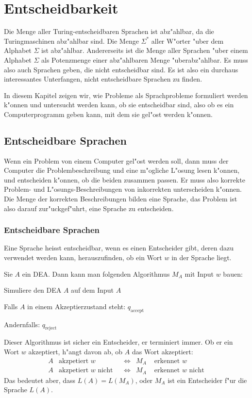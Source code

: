 % 
%
\chapter{Entscheidbarkeit\label{chapter-entscheidbarkeit}}
\rhead{}
Die Menge aller Turing-entscheidbaren Sprachen ist abz"ahlbar,
da die Turingmaschinen abz"ahlbar sind.
Die Menge $\Sigma^*$ aller W"orter "uber dem Alphabet $\Sigma$ ist abz"ahlbar.
Andererseits ist die Menge aller Sprachen "uber einem Alphabet $\Sigma$
als Potenzmenge einer abz"ahlbaren Menge "uberabz"ahlbar. Es muss
also auch Sprachen geben, die nicht entscheidbar sind. Es ist also
ein durchaus interessantes Unterfangen, nicht entscheidbare Sprachen
zu finden.

In diesem Kapitel zeigen wir, wie Probleme als Sprachprobleme
formuliert werden k"onnen und untersucht werden kann, ob sie entscheidbar sind,
also ob es ein Computerprogramm geben kann, mit dem sie gel"ost werden
k"onnen.

\section{Entscheidbare Sprachen}
Wenn ein Problem von einem Computer gel"ost werden soll, dann
muss der Computer die Problembeschreibung und eine m"ogliche L"osung
lesen k"onnen, und entscheiden k"onnen, ob die beiden zusammen passen.
Er muss also korrekte Problem- und L"osungs-Beschreibungen von
inkorrekten unterscheiden k"onnen. Die Menge der korrekten
Beschreibungen bilden eine Sprache, das Problem ist also darauf
zur"uckgef"uhrt, eine Sprache zu entscheiden.

\subsection{Entscheidbare Sprachen}
Eine Sprache heisst entscheidbar, wenn es einen Entscheider gibt, deren
dazu verwendet werden kann, herauszufinden, ob ein Wort $w$ in der Sprache
liegt. 

\begin{beispiel}
Sie $A$ ein DEA. Dann kann man folgenden Algorithmus $M_A$ mit Input $w$ bauen:
\begin{compactenum}
\item Simuliere den DEA $A$ auf dem Input $A$
\item Falls $A$ in einem Akzeptierzustand steht: $q_{\text{accept}}$
\item Andernfalls: $q_{\text{reject}}$
\end{compactenum}
Dieser Algorithmus ist sicher ein Entscheider, er terminiert immer.
Ob er ein Wort $w$ akzeptiert, h"angt davon ab, ob $A$ das Wort akzeptiert:
\begin{align*}
  A&\text{akzpetiert $w$}&
   &\Leftrightarrow&
M_A&\text{ erkennet $w$}
\\
  A&\text{akzpetiert $w$ nicht}&
   &\Leftrightarrow&
M_A&\text{ erkennet $w$ nicht}
\end{align*}
Das bedeutet aber, dass $L(A)=L(M_A)$, oder $M_A$ ist ein Entscheider f"ur
die Sprache $L(A)$.
\end{beispiel}

